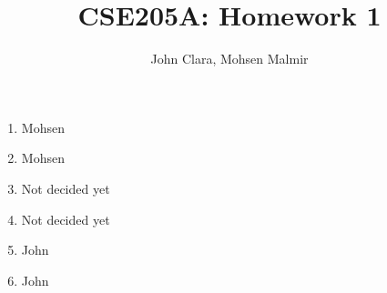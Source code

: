 \documentclass[11pt, oneside]{article}   	%
\title{CSE205A: Homework 1}
\author{John Clara, Mohsen Malmir}
\begin{document}
\maketitle

\begin{enumerate}
\item Mohsen

\item Mohsen

\item Not decided yet

\item Not decided yet

\item John

\item John


\end{enumerate}
\end{document}

